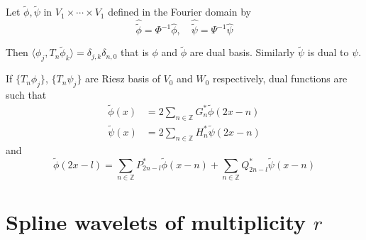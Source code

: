\documentclass[a4paper, 11pt]{article}
\begin{document}
Let $\tilde{\phi}, \tilde{\psi}$ in $V_1\times\cdots\times V_1$ defined in the Fourier domain by
\begin{equation*}
  \hat{\tilde{\phi}} = \Phi^{-1} \hat{\phi}, \quad \hat{\tilde{\psi}} = \Psi^{-1} \hat{\psi}
\end{equation*}

Then $\langle \phi_j, T_n \tilde{\phi}_k\rangle = \delta_{j,k} \delta_{n,0}$ that is $\phi$ and $\tilde{\phi}$ are dual 
basis. Similarly $\tilde{\psi}$ is dual to $\psi$.  

\begin{thm}{2.3} If $\{T_n \phi_j\}$, $\{T_n \psi_j\}$ are Riesz basis of $V_0$ and $W_0$ respectively, dual functions 
  are such that
  \begin{align*}
    \tilde{\phi}(x) &= 2\sum_{n \in \mathbb{Z}} G_n^* \tilde{\phi}(2x-n) \\
    \tilde{\psi}(x) &= 2\sum_{n \in \mathbb{Z}} H_n^* \tilde{\psi}(2x-n)
  \end{align*}
  and
  \begin{equation}
    \tilde{\phi}(2x-l) = \sum_{n \in \mathbb{Z}} P_{2n-l}^* \tilde{\phi}(x-n) + \sum_{n \in \mathbb{Z}} Q_{2n-l}^* 
    \tilde{\psi}(x-n)
  \end{equation}
\end{thm}

\section{Spline wavelets of multiplicity $r$}
\end{document}
